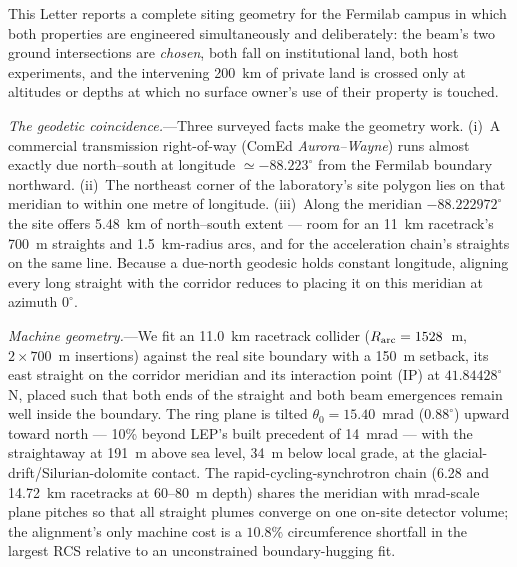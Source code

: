 \documentclass[aps,prl,reprint,superscriptaddress,nofootinbib]{revtex4-2}
\begin{document}
This Letter reports a complete siting geometry for the Fermilab campus in
which both properties are engineered simultaneously and deliberately: the
beam's two ground intersections are \emph{chosen}, both fall on
institutional land, both host experiments, and the intervening 200~km of
private land is crossed only at altitudes or depths at which no surface
owner's use of their property is touched.

\emph{The geodetic coincidence.}---Three surveyed facts make the geometry
work. (i)~A commercial transmission right-of-way (ComEd
\emph{Aurora--Wayne}) runs almost exactly due north--south at longitude
$\simeq -88.223^\circ$ from the Fermilab boundary northward.
(ii)~The northeast corner of the laboratory's site polygon lies on that
meridian to within one metre of longitude. (iii)~Along the meridian
$-88.222972^\circ$ the site offers 5.48~km of north--south extent ---
room for an 11~km racetrack's 700~m straights and 1.5~km-radius arcs, and
for the acceleration chain's straights on the same line. Because a
due-north geodesic holds constant longitude, aligning every long straight
with the corridor reduces to placing it on this meridian at azimuth
$0^\circ$.

\emph{Machine geometry.}---We fit an 11.0~km racetrack collider
($R_{\rm arc}=1528$~m, $2\times700$~m insertions) against the real site
boundary with a 150~m setback, its east straight on the corridor meridian
and its interaction point (IP) at $41.84428^\circ$\,N, placed such that
both ends of the straight and both beam emergences remain well inside the
boundary. The ring plane is tilted $\theta_0 = 15.40$~mrad
($0.88^\circ$) upward toward north --- 10\% beyond LEP's built precedent
of 14~mrad --- with the straightaway at 191~m above sea level, 34~m below
local grade, at the glacial-drift/Silurian-dolomite contact. The rapid-cycling-synchrotron
chain (6.28 and 14.72~km racetracks at 60--80~m depth) shares the
meridian with mrad-scale plane pitches so that all straight plumes
converge on one on-site detector volume; the alignment's only machine
cost is a $10.8\%$ circumference shortfall in the largest RCS relative to
an unconstrained boundary-hugging fit.
\end{document}
